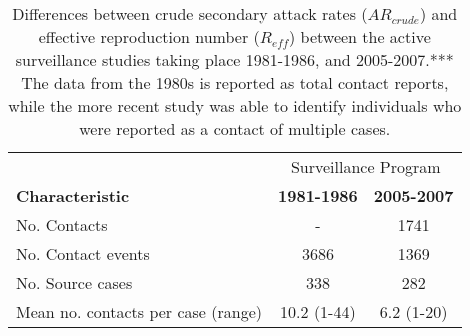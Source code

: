 \begin{table} %
\centering %
\caption{Differences between crude secondary attack rates ($AR_{crude}$) and effective reproduction number ($R_{eff}$) between the active surveillance studies taking place 1981-1986, and 2005-2007.*** The data from the 1980s is reported as total contact reports, while the more recent study was able to identify individuals who were reported as a contact of multiple cases.} %
\begin{tabular}{lcc} %
\toprule %
& \multicolumn{2}{c}{Surveillance Program} \\ %
\cmidrule(l){2-3} %
\textbf{Characteristic} & \textbf{1981-1986} & \textbf{2005-2007} \\ %
\midrule %
No. Contacts & - & 1741 \\ %
No. Contact events & 3686 & 1369 \\ %
No. Source cases & 338 & 282 \\ %
Mean no. contacts per case (range) & 10.2 (1-44) & 6.2 (1-20) \\ %
\bottomrule %
\end{tabular}
\end{table}



